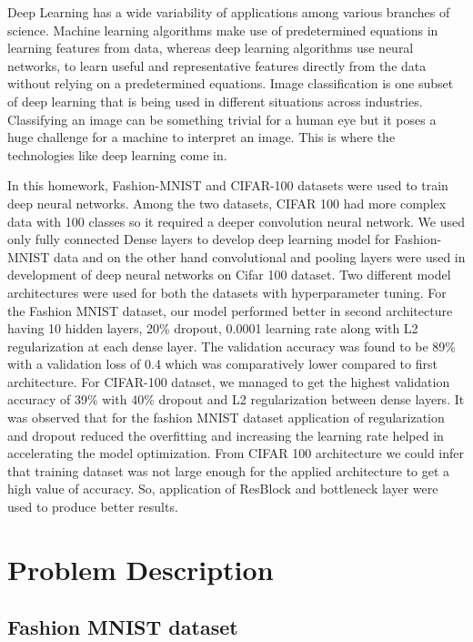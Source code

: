 \documentclass{article}
\begin{document}
Deep Learning has a wide variability of applications among various branches of science. Machine learning algorithms make use of predetermined equations in learning features from data, whereas deep learning algorithms use neural networks, to learn useful and representative features directly from the data without relying on a predetermined equations. Image classification is one subset of deep learning that is being used in different situations across industries. Classifying an image can be something trivial for a human eye but it poses a huge challenge for a machine to interpret an image. This is where the technologies like deep learning come in.\par
In this homework, Fashion-MNIST and CIFAR-100 datasets were used to train deep neural networks. Among the two datasets, CIFAR 100 had more complex data with 100 classes so it required a deeper convolution neural network. We used only fully connected Dense layers to develop deep learning model for Fashion-MNIST data and on the other hand convolutional and pooling layers were used in development of deep neural networks on Cifar 100 dataset.  Two different model architectures were used for both the datasets with hyperparameter tuning. For the Fashion MNIST dataset, our model performed better in second architecture having 10 hidden layers, 20\% dropout, 0.0001 learning rate along with L2 regularization at each dense layer. The validation accuracy was found to be 89\% with a validation loss of 0.4 which was comparatively lower compared to first architecture. For CIFAR-100 dataset, we managed to get the highest validation accuracy of 39\% with 40\% dropout and L2 regularization between dense layers. It was observed that for the fashion MNIST dataset application of regularization and dropout reduced the overfitting and increasing the learning rate helped in accelerating the model optimization. From CIFAR 100 architecture we could infer that training dataset was not large enough for the applied architecture to get a high value of accuracy. So, application of ResBlock and bottleneck layer were used to produce better results.

\section{Problem Description}
\subsection{Fashion MNIST dataset}
    
\end{document}
